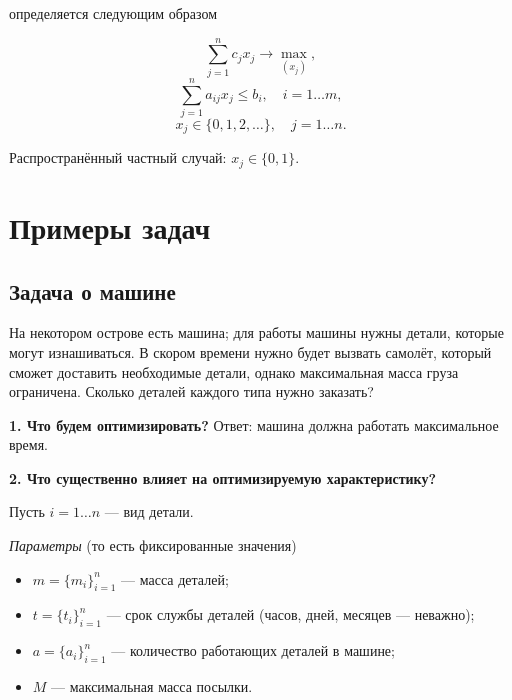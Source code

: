 
 определяется следующим образом

\[\sum_{j=1}^{n} c_j x_j \to \max_{(x_j)},\]
\[\sum_{j=1}^{n}a_{ij} x_j \le b_i, \quad i = 1\dots m,\]
\[x_j \in \{0, 1, 2, \dots\}, \quad j = 1\dots n.\]

Распространённый частный случай: $x_j \in \{0, 1\}$.

\section{Примеры задач}

\subsection{Задача о машине}

\problem[о машине]\label{pr:car_on_island}

На некотором острове есть машина; для работы машины нужны детали, которые могут изнашиваться. В скором времени нужно будет вызвать самолёт, который сможет доставить необходимые детали, однако максимальная масса груза ограничена. Сколько деталей каждого типа нужно заказать?

\mathmodel

\textbf{1. Что будем оптимизировать?} Ответ: машина должна работать максимальное время.

\bigskip

\textbf{2. Что существенно влияет на оптимизируемую характеристику?}

Пусть $i = 1 \dots n$ --- вид детали.

\bigskip

\textit{Параметры} (то есть фиксированные значения)

\begin{itemize}[nosep]
	\item $m = \{m_i\}_{i=1}^n$ --- масса деталей;
	
	\item $t = \{t_i\}_{i=1}^n$ --- срок службы деталей (часов, дней, месяцев --- неважно);

	\item $a = \{a_i\}_{i=1}^n$ --- количество работающих деталей в машине;
	
	\item $M$ --- максимальная масса посылки.
\end{itemize}

\bigskip

